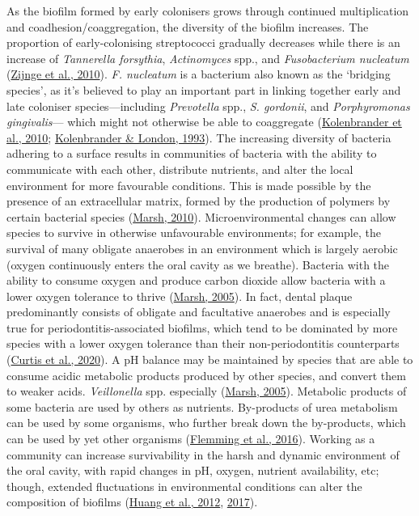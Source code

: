 \documentclass[
  letterpaper,
]{book}
\begin{document}
As the biofilm formed by early colonisers grows through continued
multiplication and coadhesion/coaggregation, the diversity of the
biofilm increases. The proportion of early-colonising streptococci
gradually decreases while there is an increase of \emph{Tannerella
forsythia}, \emph{Actinomyces} spp., and \emph{Fusobacterium nucleatum}
(\protect\hyperlink{ref-zijngeBiofilmArchitecture2010}{Zijnge et al.,
2010}). \emph{F. nucleatum} is a bacterium also known as the `bridging
species', as it's believed to play an important part in linking together
early and late coloniser species---including \emph{Prevotella} spp.,
\emph{S. gordonii}, and \emph{Porphyromonas gingivalis}--- which might
not otherwise be able to coaggregate
(\protect\hyperlink{ref-kolenbranderOralMultispecies2010}{Kolenbrander
et al., 2010};
\protect\hyperlink{ref-kolenbranderAdhereToday1993}{Kolenbrander \&
London, 1993}). The increasing diversity of bacteria adhering to a
surface results in communities of bacteria with the ability to
communicate with each other, distribute nutrients, and alter the local
environment for more favourable conditions. This is made possible by the
presence of an extracellular matrix, formed by the production of
polymers by certain bacterial species
(\protect\hyperlink{ref-marshMicrobiologyDental2010}{Marsh, 2010}).
Microenvironmental changes can allow species to survive in otherwise
unfavourable environments; for example, the survival of many obligate
anaerobes in an environment which is largely aerobic (oxygen
continuously enters the oral cavity as we breathe). Bacteria with the
ability to consume oxygen and produce carbon dioxide allow bacteria with
a lower oxygen tolerance to thrive
(\protect\hyperlink{ref-marshDentalPlaque2005}{Marsh, 2005}). In fact,
dental plaque predominantly consists of obligate and facultative
anaerobes and is especially true for periodontitis-associated biofilms,
which tend to be dominated by more species with a lower oxygen tolerance
than their non-periodontitis counterparts
(\protect\hyperlink{ref-curtisRoleMicrobiota2020}{Curtis et al., 2020}).
A pH balance may be maintained by species that are able to consume
acidic metabolic products produced by other species, and convert them to
weaker acids. \emph{Veillonella} spp. especially
(\protect\hyperlink{ref-marshDentalPlaque2005}{Marsh, 2005}). Metabolic
products of some bacteria are used by others as nutrients. By-products
of urea metabolism can be used by some organisms, who further break down
the by-products, which can be used by yet other organisms
(\protect\hyperlink{ref-flemmingBiofilmsEmergent2016}{Flemming et al.,
2016}). Working as a community can increase survivability in the harsh
and dynamic environment of the oral cavity, with rapid changes in pH,
oxygen, nutrient availability, etc; though, extended fluctuations in
environmental conditions can alter the composition of biofilms
(\protect\hyperlink{ref-huangFactorsAssociated2012}{Huang et al., 2012},
\protect\hyperlink{ref-huangEffectArginine2017}{2017}).
\end{document}
